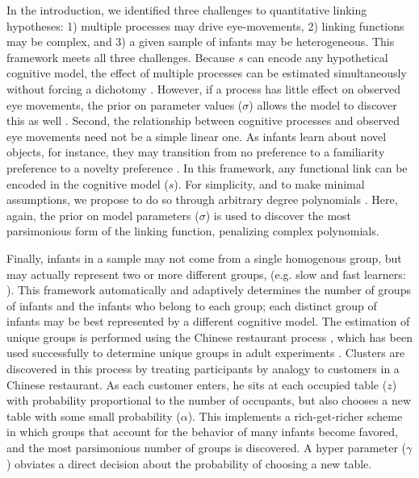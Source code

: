\documentclass[12pt]{article}
\begin{document}
	In the introduction, we identified three challenges to quantitative linking hypotheses: 1) multiple processes may drive eye-movements, 2) linking functions may be complex, and 3) a given sample of infants may be heterogeneous. This framework meets all three challenges. Because $s$ can encode any hypothetical cognitive model, the effect of multiple processes can be estimated simultaneously without forcing a dichotomy \cite{Newell1973, Anderson2011}.  However, if a process has little effect on observed eye movements, the prior on parameter values ($\sigma$) allows the model to discover this as well \cite{Figuerido2002}. Second, the relationship between cognitive processes and observed eye movements need not be a simple linear one. As infants learn about novel objects, for instance, they may transition from no preference to a familiarity preference to a novelty preference \cite{Hunter1988, Cohen2004}. In this framework, any functional link can be encoded in the cognitive model ($s$). For simplicity, and to make minimal assumptions, we propose to do so through arbitrary degree polynomials \cite{Barr2008, Jackson2009}. Here, again, the prior on model parameters ($\sigma$) is used to discover the most parsimonious form of the linking function, penalizing complex polynomials.

	Finally, infants in a sample may not come from a single homogenous group, but may actually represent two or more different groups, (e.g. slow and fast learners: \cite{Cashon2000, Schoner2006, Yu2011a}). This framework automatically and adaptively determines the number of groups of infants and the infants who belong to each group; each distinct group of infants may be best represented by a different cognitive model. The estimation of unique groups is performed using the Chinese restaurant process \cite{Aldous1985, Rasmussen2000}, which has been used successfully to determine unique groups in adult experiments \cite{Navarro2006}. Clusters are discovered in this process by treating participants by analogy to customers in a Chinese restaurant. As each customer enters, he sits at each occupied table ($z$) with probability proportional to the number of occupants, but also chooses a new table with some small probability ($\alpha$). This implements a rich-get-richer scheme in which groups that account for the behavior of many infants become favored, and the most parsimonious number of groups is discovered. A hyper parameter ($\gamma$) obviates a direct decision about the probability of choosing a new table.
\end{document}
